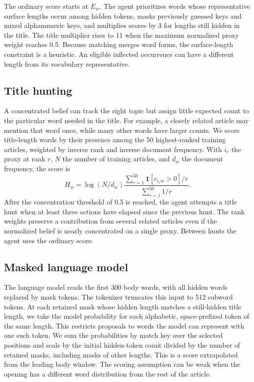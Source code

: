 \documentclass[conference]{IEEEtran}
\begin{document}
The ordinary score starts at $E_w$. The agent prioritizes words whose representative surface lengths occur among hidden tokens, masks previously guessed keys and mixed alphanumeric keys, and multiplies scores by 3 for lengths still hidden in the title. The title multiplier rises to 11 when the maximum normalized proxy weight reaches 0.5. Because matching merges word forms, the surface-length constraint is a heuristic. An eligible inflected occurrence can have a different length from its vocabulary representative.

\subsection{Title hunting}
A concentrated belief can track the right topic but assign little expected count to the particular word needed in the title. For example, a closely related article may mention that word once, while many other words have larger counts. We score title-length words by their presence among the 50 highest-ranked training articles, weighted by inverse rank and inverse document frequency. With $i_r$ the proxy at rank $r$, $N$ the number of training articles, and $d_w$ the document frequency, the score is
\begin{equation}
 H_w=\log(N/d_w)
 \frac{\sum_{r=1}^{50}\mathbf{1}[c_{i_r w}>0]/r}
 {\sum_{r=1}^{50}1/r}.
\end{equation}
After the concentration threshold of 0.5 is reached, the agent attempts a title hunt when at least three actions have elapsed since the previous hunt. The rank weights preserve a contribution from several related articles even if the normalized belief is nearly concentrated on a single proxy. Between hunts the agent uses the ordinary score.

\subsection{Masked language model}
The language model reads the first 300 body words, with all hidden words replaced by mask tokens. The tokenizer truncates this input to 512 subword tokens. At each retained mask whose hidden length matches a still-hidden title length, we take the model probability for each alphabetic, space-prefixed token of the same length. This restricts proposals to words the model can represent with one such token. We sum the probabilities by match key over the selected positions and scale by the initial hidden-token count divided by the number of retained masks, including masks of other lengths. This is a score extrapolated from the leading body window. The scoring assumption can be weak when the opening has a different word distribution from the rest of the article.
\end{document}
